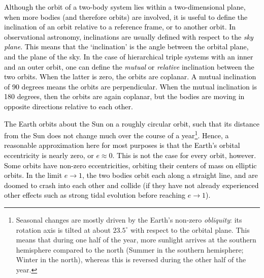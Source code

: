 \documentclass[main.tex]{subfiles}
\begin{document}
\begin{tcolorbox}[sharp corners, colback=red!30, colframe=red!80!blue, title=Box \refstepcounter{educhap3}\label{boxchap3:incl}\ref{boxchap3:incl} -- Orbital Inclination]
\par \textcolor{black}{ Although the orbit of a two-body system lies within a two-dimensional plane, when more bodies (and therefore orbits) are involved, it is useful to define the inclination of an orbit relative to a reference frame, or to another orbit. In observational astronomy, inclinations are usually defined with respect to the {\it sky plane}. This means that the `inclination' is the angle between the orbital plane, and the plane of the sky. In the case of hierarchical triple systems with an inner and an outer orbit, one can define the {\it mutual} or {\it relative} inclination between the two orbits. When the latter is zero, the orbits are coplanar. A mutual inclination of 90 degrees means the orbits are perpendicular. When the mutual inclination is 180 degrees, then the orbits are again coplanar, but the bodies are moving in opposite directions relative to each other. }  
\end{tcolorbox}



\begin{tcolorbox}[sharp corners, colback=red!30, colframe=red!80!blue, title=Box \refstepcounter{educhap3}\label{boxchap3:ecc}\ref{boxchap3:ecc} -- Orbital Eccentricity]
\par \textcolor{black}{The Earth orbits about the Sun on a roughly circular orbit, such that its distance from the Sun does not change much over the course of a year\footnote{Seasonal changes are mostly driven by the Earth's non-zero {\it obliquity}: its rotation axis is tilted at about $23.5^\circ$ with respect to the orbital plane. This means that during one half of the year, more sunlight arrives at the southern hemisphere compared to the north (Summer in the southern hemisphere; Winter in the north), whereas this is reversed during the other half of the year. }. Hence, a reasonable approximation here for most purposes is that the Earth's orbital eccentricity is nearly zero, or $e \approx 0$.  This is not the case for every orbit, however.  Some orbits have non-zero eccentricities, orbiting their centers of mass on elliptic orbits.  In the limit $e \rightarrow 1$, the two bodies orbit each along a straight line, and are doomed to crash into each other and collide (if they have not already experienced other effects such as strong tidal evolution before reaching $e \rightarrow 1$).}
\end{tcolorbox}
\end{document}

